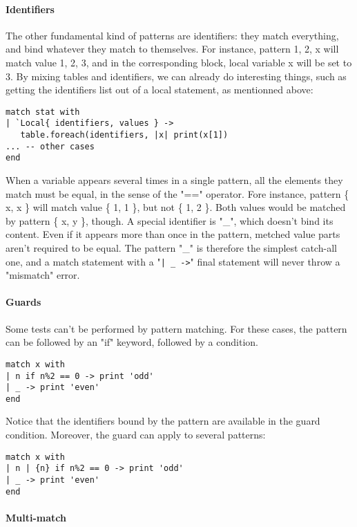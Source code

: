 \paragraph{Identifiers}
The other fundamental kind of patterns are identifiers: they match everything,
and bind whatever they match to themselves. For instance, pattern {1, 2, x} will
match value {1, 2, 3}, and in the corresponding block, local variable x will be
set to 3. By mixing tables and identifiers, we can already do interesting
things, such as getting the identifiers list out of a local statement, as
mentionned above:

\begin{verbatim}
match stat with
| `Local{ identifiers, values } ->
   table.foreach(identifiers, |x| print(x[1])
... -- other cases
end
\end{verbatim}

When a variable appears several times in a single pattern, all the elements they
match must be equal, in the sense of the "==" operator. Fore instance, pattern \{
  x, x \} will match value \{ 1, 1 \}, but not \{ 1, 2 \}. Both values would be
matched by pattern \{ x, y \}, though. A special identifier is "\_", which doesn't
bind its content. Even if it appears more than once in the pattern, metched
value parts aren't required to be equal. The pattern "\_" is therefore the
simplest catch-all one, and a match statement with a "{\tt| \_ ->}" final
statement will never throw a "mismatch" error.

\paragraph{Guards}

Some tests can't be performed by pattern matching. For these cases, the pattern
can be followed by an "if" keyword, followed by a condition.

\begin{verbatim}
match x with
| n if n%2 == 0 -> print 'odd'
| _ -> print 'even'
end
\end{verbatim}

Notice that the identifiers bound by the pattern are available in the guard
condition. Moreover, the guard can apply to several patterns:

\begin{verbatim}
match x with
| n | {n} if n%2 == 0 -> print 'odd'
| _ -> print 'even'
end
\end{verbatim}

\paragraph{Multi-match}

